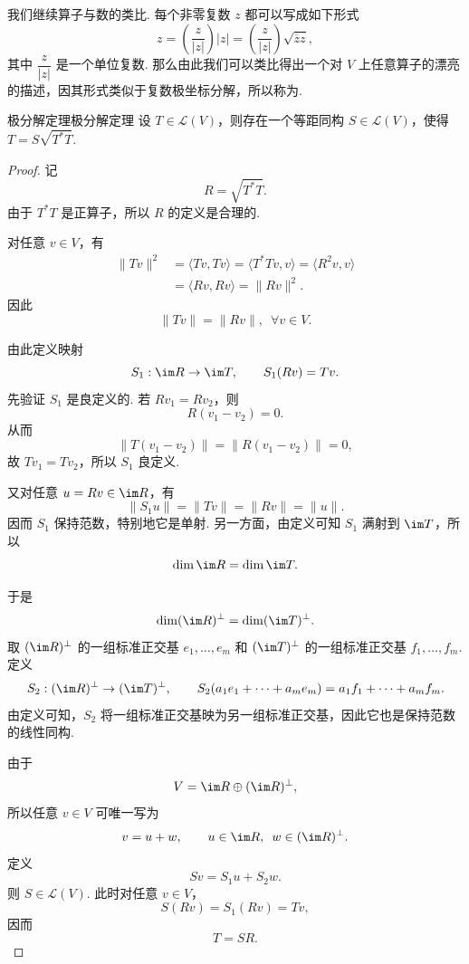我们继续算子与数的类比. 每个非零复数 $z$ 都可以写成如下形式
\[
    z = \left(\frac{z}{\lvert z \rvert}\right)\lvert z \rvert
      = \left(\frac{z}{\lvert z \rvert}\right)\sqrt{\overline{z}z},
\]
其中 $\dfrac{z}{\lvert z \rvert}$ 是一个单位复数. 那么由此我们可以类比得出一个对 $V$ 上任意算子的漂亮的描述，因其形式类似于复数极坐标分解，所以称为.

\begin{theorem}{极分解定理}{极分解定理} 
    设 $T \in \mathcal{L}(V)$，则存在一个等距同构 $S \in \mathcal{L}(V)$，使得 $T = S\sqrt{T^*T}$.
\end{theorem}

\begin{proof}
    记
    \[
        R = \sqrt{T^*T}.
    \]
    由于 $T^*T$ 是正算子，所以 $R$ 的定义是合理的.

    对任意 $v \in V$，有
    \begin{align*}
        \lVert Tv \rVert^2
         & = \langle Tv, Tv \rangle
          = \langle T^*Tv, v \rangle
          = \langle R^2v, v \rangle  \\
         & = \langle Rv, Rv \rangle
          = \lVert Rv \rVert^2.
    \end{align*}
    因此
    \[
        \lVert Tv \rVert = \lVert Rv \rVert,\enspace \forall v \in V.
    \]

    由此定义映射
    \[
        S_1 : \im R \to \im T,\qquad S_1(Rv) = Tv.
    \]
    先验证 $S_1$ 是良定义的. 若 $Rv_1 = Rv_2$，则
    \[
        R(v_1-v_2)=0.
    \]
    从而
    \[
        \lVert T(v_1-v_2) \rVert = \lVert R(v_1-v_2) \rVert = 0,
    \]
    故 $Tv_1 = Tv_2$，所以 $S_1$ 良定义.

    又对任意 $u = Rv \in \im R$，有
    \[
        \lVert S_1u \rVert = \lVert Tv \rVert = \lVert Rv \rVert = \lVert u \rVert.
    \]
    因而 $S_1$ 保持范数，特别地它是单射. 另一方面，由定义可知 $S_1$ 满射到 $\im T$，所以
    \[
        \dim \im R = \dim \im T.
    \]

    于是
    \[
        \dim (\im R)^\perp = \dim (\im T)^\perp.
    \]
    取 $(\im R)^\perp$ 的一组标准正交基 $e_1, \ldots, e_m$ 和 $(\im T)^\perp$ 的一组标准正交基 $f_1, \ldots, f_m$. 定义
    \[
        S_2 : (\im R)^\perp \to (\im T)^\perp,\qquad
        S_2(a_1e_1 + \cdots + a_me_m) = a_1f_1 + \cdots + a_mf_m.
    \]
    由定义可知，$S_2$ 将一组标准正交基映为另一组标准正交基，因此它也是保持范数的线性同构.

    由于
    \[
        V = \im R \oplus (\im R)^\perp,
    \]
    所以任意 $v \in V$ 可唯一写为
    \[
        v = u + w,\qquad u \in \im R,\enspace w \in (\im R)^\perp.
    \]
    定义
    \[
        Sv = S_1u + S_2w.
    \]
    则 $S \in \mathcal{L}(V)$. 此时对任意 $v \in V$，
    \[
        S(Rv) = S_1(Rv) = Tv,
    \]
    因而
    \[
        T = SR.
    \]


\end{proof}
